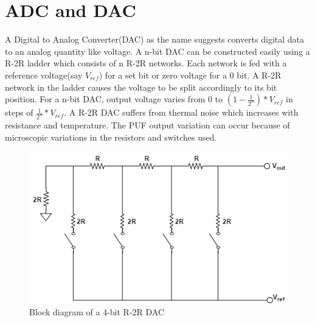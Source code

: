 \section{ADC and DAC}
A Digital to Analog Converter(DAC) as the name suggests converts digital data to an analog quantity like voltage. A n-bit DAC can be constructed easily using a R-2R ladder which consists of n R-2R networks. Each network is fed with a reference voltage(say $V_{ref}$) for a set bit or zero voltage for a 0 bit. A R-2R network in the ladder causes the voltage to be split accordingly to its bit position. For a n-bit DAC, output voltage varies from 0 to $(1-\frac{1}{2^{n}})*V_{ref}$ in steps of $\frac{1}{2^{n}}*V_{ref}$. A R-2R DAC suffers from thermal noise which increases with resistance and temperature. The PUF output variation can occur because of microscopic variations in the resistors and switches used.
\begin{figure}[H]
\includegraphics[scale=0.8]{SA-ADC.png}
\centering
\caption{Block diagram of a 4-bit R-2R DAC}
\end{figure}

